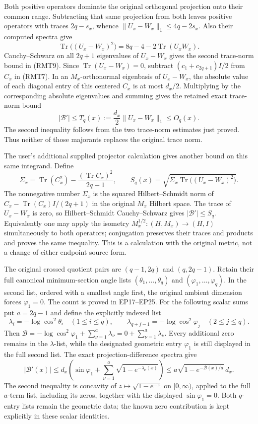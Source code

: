 Both positive operators dominate the original orthogonal projection
onto their common range.  Subtracting that same projection from
both leaves positive operators with traces \(2q-s_x\), whence
\(\|U_x-W_x\|_1\leq4q-2s_x\).  Also their computed spectra give
\[
 \operatorname{Tr}\bigl((U_x-W_x)^2\bigr)
 =8q-4-2\operatorname{Tr}(U_xW_x).
 \tag{RMT10}
\]
Cauchy--Schwarz on all \(2q+1\) eigenvalues of \(U_x-W_x\)
gives the second trace-norm bound in (RMT9).
Since \(\operatorname{Tr}(U_x-W_x)=0\), subtract
\((c_1+c_{2q+1})I/2\) from \(C_x\) in (RMT7).
In an \(M_x\)-orthonormal eigenbasis of \(U_x-W_x\), the
absolute value of each diagonal entry of this centered \(C_x\)
is at most \(d_x/2\).  Multiplying by the corresponding
absolute eigenvalues and summing gives the retained exact
trace-norm bound
\[
 |\mathcal B'|\leq T_q(x):=\frac{d_x}{2}\|U_x-W_x\|_1
                   \leq O_q(x).
 \tag{RMT10a}
\]
The second inequality follows from the two trace-norm
estimates just proved.  Thus neither of those majorants
replaces the original trace norm.

The user's additional supplied projector calculation gives another
bound on this same integrand.  Define
\[
 \Sigma_x=\operatorname{Tr}(C_x^2)
              -\frac{(\operatorname{Tr}C_x)^2}{2q+1},
 \qquad
 S_q(x)=\sqrt{\Sigma_x
                 \operatorname{Tr}\bigl((U_x-W_x)^2\bigr)}.
 \tag{RMT10b}
\]
The nonnegative number \(\Sigma_x\) is the squared
Hilbert--Schmidt norm of
\(C_x-\operatorname{Tr}(C_x)I/(2q+1)\) in the original
\(M_x\) Hilbert space.  The trace of \(U_x-W_x\) is zero,
so Hilbert--Schmidt Cauchy--Schwarz gives
\(|\mathcal B'|\leq S_q\).  Equivalently one may apply the
isometry \(M_x^{1/2}:(H,M_x)\to(H,I)\) simultaneously to
both operators; conjugation preserves their traces and
products and proves the same inequality.  This is a
calculation with the original metric, not a change of
either endpoint source form.

The original crossed quotient pairs are \((q-1,2q)\) and
\((q,2q-1)\).  Retain their full canonical minimum-section angle
lists \((\theta_1,\ldots,\theta_q)\) and
\((\varphi_1,\ldots,\varphi_q)\).  In the second list, ordered
with a smallest angle first, the original ambient dimension
forces \(\varphi_1=0\).  The count is proved in EP17--EP25.
For the following scalar sums put \(a=2q-1\) and define the
explicitly indexed list
\[
 \lambda_i=-\log\cos^2\theta_i\quad(1\leq i\leq q),\qquad
 \lambda_{q+j-1}=-\log\cos^2\varphi_j\quad(2\leq j\leq q).
\]
Then \(\mathcal B=-\log\cos^2\varphi_1+
\sum_{\nu=1}^{a}\lambda_\nu=0+\sum_{\nu=1}^{a}\lambda_\nu\).
Every additional zero remains in the \(\lambda\)-list, while
the designated geometric entry \(\varphi_1\) is still displayed
in the full second list.  The exact projection-difference
spectra give
\[
 |\mathcal B'(x)|
 \leq d_x\left(\sin\varphi_1+
               \sum_{\nu=1}^{a}\sqrt{1-e^{-\lambda_\nu(x)}}\right)
 \leq a\sqrt{1-e^{-\mathcal B(x)/a}}\,d_x.
 \tag{RMT11}
\]
The second inequality is concavity of \(z\mapsto\sqrt{1-e^{-z}}\)
on \([0,\infty)\), applied to the full \(a\)-term list, including
its zeros, together with the displayed \(\sin\varphi_1=0\).
Both \(q\)-entry lists remain the geometric data; the known
zero contribution is kept explicitly in these scalar identities.

